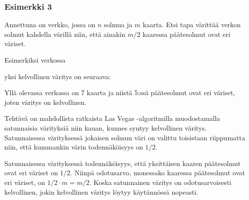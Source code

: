 \subsubsection{Esimerkki 3}


\begin{task}
Annettuna on verkko, jossa on $n$ solmua ja $m$ kaarta.
Etsi tapa värittää verkon solmut kahdella värillä
niin, että ainakin $m/2$ kaaressa
päätesolmut ovat eri väriset.
\end{task}

Esimerkiksi verkossa
\begin{center}
\end{center}
yksi kelvollinen väritys on seuraava:
\begin{center}
\end{center}
Yllä olevassa verkossa on 7 kaarta ja niistä 5:ssä
päätesolmut ovat eri väriset,
joten väritys on kelvollinen.

Tehtävä on mahdollista ratkaista Las Vegas -algoritmilla
muodostamalla satunnaisia värityksiä niin kauan,
kunnes syntyy kelvollinen väritys.
Satunnaisessa värityksessä jokaisen solmun väri on
valittu toisistaan riippumatta niin,
että kummankin värin todennäköisyys on $1/2$.

Satunnaisessa värityksessä todennäköisyys, että yksittäisen kaaren päätesolmut
ovat eri väriset on $1/2$. Niinpä odotusarvo, monessako kaaressa
päätesolmut ovat eri väriset, on $1/2 \cdot m = m/2$.
Koska satunnainen väritys on odotusarvoisesti kelvollinen,
jokin kelvollinen väritys löytyy käytännössä nopeasti.

